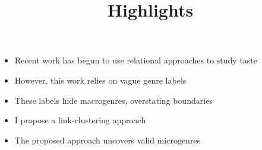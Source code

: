 \documentclass[a4paper,12pt]{extarticle}
\title{Highlights}
\begin{document}
\maketitle
\begin{itemize}
    \item Recent work has begun to use relational approaches to study taste
    \item However, this work relies on vague genre labels
    \item These labels hide macrogenres, overstating boundaries
    \item I propose a link-clustering approach
    \item The proposed approach uncovers valid microgenres
\end{itemize}
\end{document}
